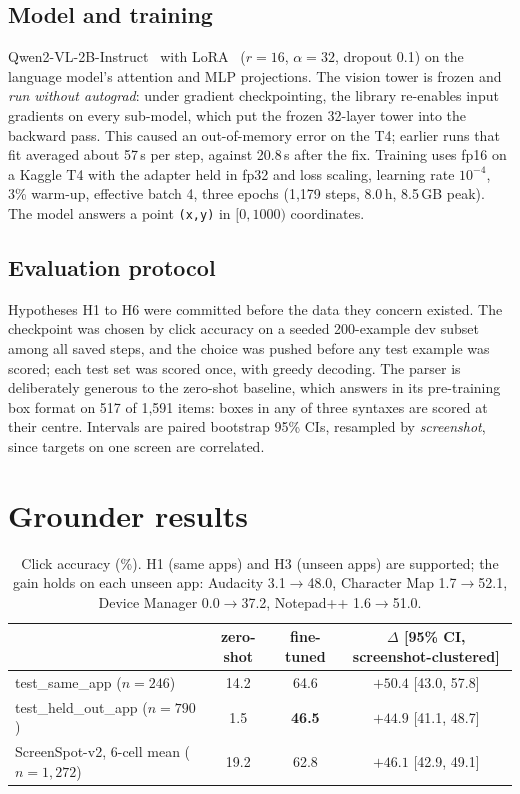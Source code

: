 \documentclass[11pt]{article}
\begin{document}
\subsection{Model and training}
Qwen2-VL-2B-Instruct~\citep{wang2024qwen2vl} with LoRA~\citep{hu2022lora} ($r{=}16$, $\alpha{=}32$,
dropout 0.1) on the language model's attention and MLP projections. The vision tower is frozen and
\emph{run without autograd}: under gradient checkpointing, the library re-enables input gradients on every
sub-model, which put the frozen 32-layer tower into the backward pass. This caused an out-of-memory error on the
T4; earlier runs that fit averaged about 57\,s per step, against 20.8\,s after the fix. Training uses fp16 on a Kaggle T4 with the adapter
held in fp32 and loss scaling, learning rate $10^{-4}$, 3\% warm-up, effective batch 4, three epochs
(1,179 steps, 8.0\,h, 8.5\,GB peak). The model answers a point \texttt{(x,y)} in $[0,1000)$ coordinates.

\subsection{Evaluation protocol}
Hypotheses H1 to H6 were committed before the data they concern existed. The checkpoint was chosen by click
accuracy on a seeded 200-example dev subset among all saved steps, and the choice was pushed before any
test example was scored; each test set was scored once, with greedy decoding. The parser is deliberately
generous to the zero-shot baseline, which answers in its pre-training box format on 517 of 1,591 items:
boxes in any of three syntaxes are scored at their centre. Intervals are paired bootstrap 95\% CIs,
resampled by \emph{screenshot}, since targets on one screen are correlated.

\section{Grounder results}

\begin{table}[t]
\centering\small
\begin{tabular}{lccc}
\toprule
& zero-shot & fine-tuned & $\Delta$ [95\% CI, screenshot-clustered] \\
\midrule
test\_same\_app ($n{=}246$) & 14.2 & 64.6 & $+50.4$ [43.0, 57.8] \\
test\_held\_out\_app ($n{=}790$) & 1.5 & \textbf{46.5} & $+44.9$ [41.1, 48.7] \\
ScreenSpot-v2, 6-cell mean ($n{=}1{,}272$) & 19.2 & 62.8 & $+46.1$ [42.9, 49.1] \\
\bottomrule
\end{tabular}
\caption{Click accuracy (\%). H1 (same apps) and H3 (unseen apps) are supported; the gain holds on each
unseen app: Audacity 3.1$\to$48.0, Character Map 1.7$\to$52.1, Device Manager 0.0$\to$37.2, Notepad++
1.6$\to$51.0.}
\label{tab:grounder}
\end{table}
\end{document}
